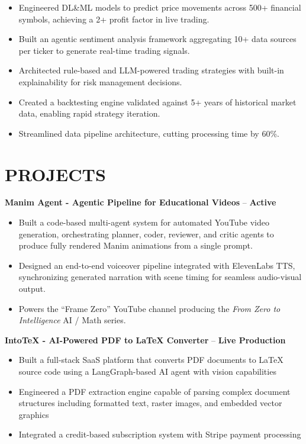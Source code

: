 \documentclass[a4paper,9pt]{extarticle}
\begin{document}
\begin{itemize}
    \item Engineered DL\&ML models to predict price movements across 500+ financial symbols, achieving a 2+ profit factor in live trading.
    \item Built an agentic sentiment analysis framework aggregating 10+ data sources per ticker to generate real-time trading signals.
    \item Architected rule-based and LLM-powered trading strategies with built-in explainability for risk management decisions.
    \item Created a backtesting engine validated against 5+ years of historical market data, enabling rapid strategy iteration.
    \item Streamlined data pipeline architecture, cutting processing time by 60\%.
\end{itemize}

\section*{PROJECTS}
\textbf{Manim Agent - Agentic Pipeline for Educational Videos} -- \href{https://www.youtube.com/@Frame-zero-yt}{\textcolor{blue}{\faYoutube}} \hfill \textbf{Active}
\begin{itemize}
    \item Built a code-based multi-agent system for automated YouTube video generation, orchestrating planner, coder, reviewer, and critic agents to produce fully rendered Manim animations from a single prompt.
    \item Designed an end-to-end voiceover pipeline integrated with ElevenLabs TTS, synchronizing generated narration with scene timing for seamless audio-visual output.
    \item Powers the ``Frame Zero'' YouTube channel producing the \textit{From Zero to Intelligence} AI / Math series.
\end{itemize}
\vspace{0.5em}

\noindent\textbf{IntoTeX - AI-Powered PDF to LaTeX Converter} -- \href{https://intotex.com}{\textcolor{blue}{\faExternalLink}} \hfill \textbf{Live Production}
\begin{itemize}
    \item Built a full-stack SaaS platform that converts PDF documents to LaTeX source code using a LangGraph-based AI agent with vision capabilities
    \item Engineered a PDF extraction engine capable of parsing complex document structures including formatted text, raster images, and embedded vector graphics
    \item Integrated a credit-based subscription system with Stripe payment processing
\end{itemize}
\end{document}
